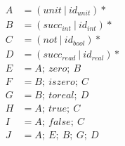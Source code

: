 \documentclass{article}
\begin{document}
\begin{enumerate}
\begin{center}
\begin{tikzpicture}
    \end{tikzpicture}
  \end{center}

  \begin{align*}
    A &= (unit~|~id_{unit})*
  \\B &= (succ_{int}~|~id_{int})*
  \\C &= (not~|~id_{bool})*
  \\D &= (succ_{read}~|~id_{real})*
  \\E &= A;~zero;~B
  \\F &= B;~iszero;~C
  \\G &= B;~toreal;~D
  \\H &= A;~true;~C
  \\I &= A;~false;~C
  \\J &= A;~E;~B;~G;~D
  \end{align*}
      
\end{enumerate}
\end{document}
